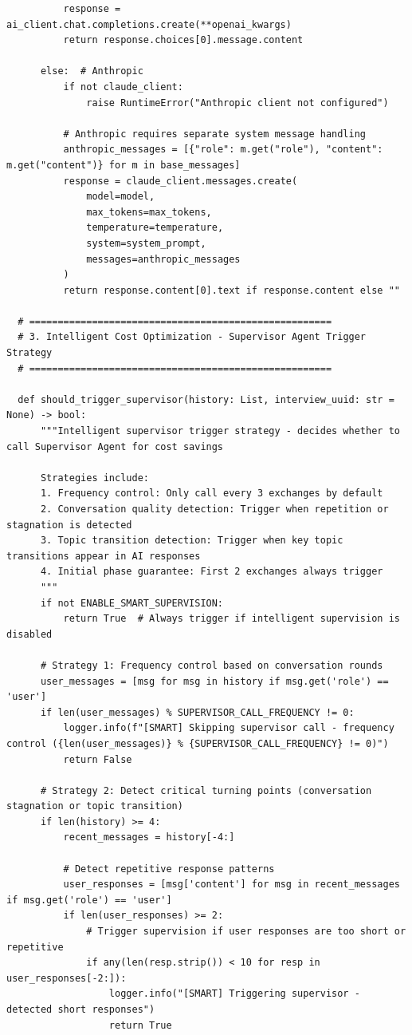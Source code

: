 \documentclass[sigchi,nonacm,manuscript]{acmart}
\begin{document}
\begin{lstlisting}
          response = ai_client.chat.completions.create(**openai_kwargs)
          return response.choices[0].message.content
          
      else:  # Anthropic
          if not claude_client:
              raise RuntimeError("Anthropic client not configured")
              
          # Anthropic requires separate system message handling
          anthropic_messages = [{"role": m.get("role"), "content": m.get("content")} for m in base_messages]
          response = claude_client.messages.create(
              model=model,
              max_tokens=max_tokens,
              temperature=temperature,
              system=system_prompt,
              messages=anthropic_messages
          )
          return response.content[0].text if response.content else ""

  # =====================================================
  # 3. Intelligent Cost Optimization - Supervisor Agent Trigger Strategy
  # =====================================================

  def should_trigger_supervisor(history: List, interview_uuid: str = None) -> bool:
      """Intelligent supervisor trigger strategy - decides whether to call Supervisor Agent for cost savings
      
      Strategies include:
      1. Frequency control: Only call every 3 exchanges by default
      2. Conversation quality detection: Trigger when repetition or stagnation is detected
      3. Topic transition detection: Trigger when key topic transitions appear in AI responses
      4. Initial phase guarantee: First 2 exchanges always trigger
      """
      if not ENABLE_SMART_SUPERVISION:
          return True  # Always trigger if intelligent supervision is disabled
      
      # Strategy 1: Frequency control based on conversation rounds
      user_messages = [msg for msg in history if msg.get('role') == 'user']
      if len(user_messages) % SUPERVISOR_CALL_FREQUENCY != 0:
          logger.info(f"[SMART] Skipping supervisor call - frequency control ({len(user_messages)} % {SUPERVISOR_CALL_FREQUENCY} != 0)")
          return False
      
      # Strategy 2: Detect critical turning points (conversation stagnation or topic transition)
      if len(history) >= 4:
          recent_messages = history[-4:]
          
          # Detect repetitive response patterns
          user_responses = [msg['content'] for msg in recent_messages if msg.get('role') == 'user']
          if len(user_responses) >= 2:
              # Trigger supervision if user responses are too short or repetitive
              if any(len(resp.strip()) < 10 for resp in user_responses[-2:]):
                  logger.info("[SMART] Triggering supervisor - detected short responses")
                  return True
          

\end{lstlisting}
\end{document}
